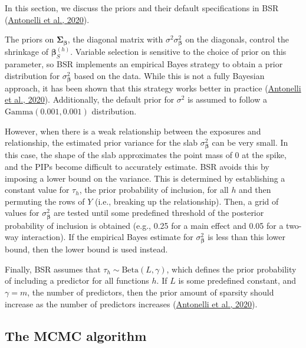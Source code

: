 \documentclass[12pt, twoside]{amherstthesis}
\begin{document}
In this section, we discuss the priors and their default specifications in BSR (\protect\hyperlink{ref-antonelli_estimating_2020}{Antonelli et al., 2020}).

The priors on \(\boldsymbol\Sigma_{\boldsymbol\beta}\), the diagonal matrix with \(\sigma^2\sigma^2_{\boldsymbol\beta}\) on the diagonals, control the shrinkage of \(\boldsymbol\beta_S^{(h)}\). Variable selection is sensitive to the choice of prior on this parameter, so BSR implements an empirical Bayes strategy to obtain a prior distribution for \(\sigma^2_{\boldsymbol\beta}\) based on the data. While this is not a fully Bayesian approach, it has been shown that this strategy works better in practice (\protect\hyperlink{ref-antonelli_estimating_2020}{Antonelli et al., 2020}). Additionally, the default prior for \(\sigma^2\) is assumed to follow a \(\textrm{Gamma}(0.001, 0.001)\) distribution.

However, when there is a weak relationship between the exposures and relationship, the estimated prior variance for the slab \(\sigma^2_{\boldsymbol\beta}\) can be very small. In this case, the shape of the slab approximates the point mass of 0 at the spike, and the PIPs become difficult to accurately estimate. BSR avoids this by imposing a lower bound on the variance. This is determined by establishing a constant value for \(\tau_h\), the prior probability of inclusion, for all \(h\) and then permuting the rows of \(Y\) (i.e., breaking up the relationship). Then, a grid of values for \(\sigma^2_{\boldsymbol\beta}\) are tested until some predefined threshold of the posterior probability of inclusion is obtained (e.g., 0.25 for a main effect and 0.05 for a two-way interaction). If the empirical Bayes estimate for \(\sigma^2_{\boldsymbol\beta}\) is less than this lower bound, then the lower bound is used instead.

Finally, BSR assumes that \(\tau_h \sim \textrm{Beta}(L,\gamma)\), which defines the prior probability of including a predictor for all functions \(h\). If \(L\) is some predefined constant, and \(\gamma=m\), the number of predictors, then the prior amount of sparsity should increase as the number of predictors increases (\protect\hyperlink{ref-antonelli_estimating_2020}{Antonelli et al., 2020}).

\hypertarget{the-mcmc-algorithm-1}{%
\subsection{The MCMC algorithm}\label{the-mcmc-algorithm-1}}
\end{document}
